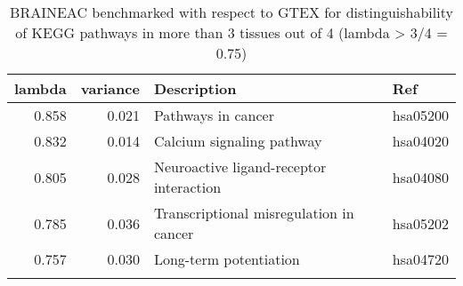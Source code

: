 \begin{longtable}{rrll}
  \hline
lambda & variance & Description & Ref \\ 
  \hline
0.858 & 0.021 & Pathways in cancer  & hsa05200 \\ 
  0.832 & 0.014 & Calcium signaling pathway  & hsa04020 \\ 
  0.805 & 0.028 & Neuroactive ligand-receptor interaction  & hsa04080 \\ 
  0.785 & 0.036 & Transcriptional misregulation in cancer  & hsa05202 \\ 
  0.757 & 0.030 & Long-term potentiation  & hsa04720 \\ 
   \hline
\hline
\caption{BRAINEAC benchmarked with respect to GTEX for distinguishability of KEGG pathways in more than 3 tissues out of 4 (lambda > 3/4 = 0.75)} 
\label{KEGGBench}
\end{longtable}
